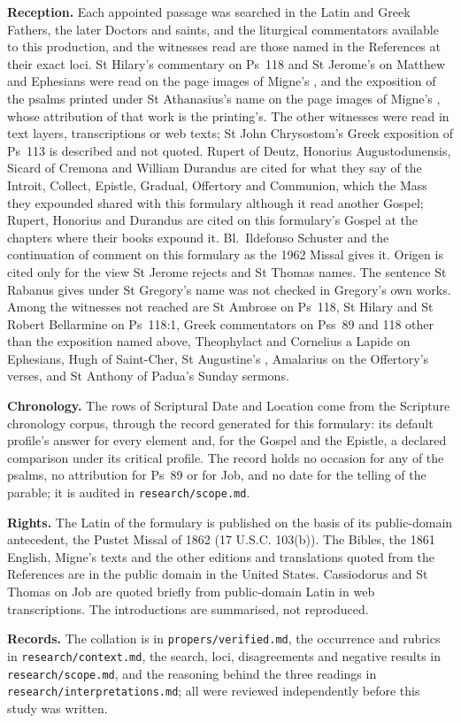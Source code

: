 {\textbf{Reception.} Each appointed passage was searched in the Latin and Greek
Fathers, the later Doctors and saints, and the liturgical commentators available to
this production, and the witnesses read are those named in the References at their
exact loci. St Hilary's commentary on Ps~118 and St Jerome's on Matthew and
Ephesians were read on the page images of Migne's , and the
exposition of the psalms printed under St Athanasius's name on the page images of
Migne's , whose attribution of that work is the printing's.
The other witnesses were read in text layers, transcriptions or web texts; St John
Chrysostom's Greek exposition of Ps~113 is described and not quoted. Rupert of Deutz, Honorius Augustodunensis, Sicard of Cremona and William
Durandus are cited for what they say of the Introit, Collect, Epistle, Gradual,
Offertory and Communion, which the Mass they expounded shared with this formulary
although it read another Gospel; Rupert, Honorius and Durandus are cited on this
formulary's Gospel at the chapters where their books expound it. Bl.\ Ildefonso
Schuster and the continuation of  comment on this
formulary as the 1962 Missal gives it. Origen is cited only for the view St Jerome
rejects and St Thomas names. The sentence St Rabanus gives under St Gregory's name
was not checked in Gregory's own works. Among the
witnesses not reached are St Ambrose on Ps~118, St Hilary and St Robert Bellarmine
on Ps~118:1, Greek commentators on Pss~89 and 118 other than the exposition named
above, Theophylact and Cornelius a Lapide on Ephesians, Hugh of Saint-Cher, St
Augustine's , Amalarius on the Offertory's verses, and St
Anthony of Padua's Sunday sermons.

\textbf{Chronology.} The rows of Scriptural Date and Location come from the
Scripture chronology corpus, through the record generated for this formulary: its
default profile's answer for every element and, for the Gospel and the Epistle, a
declared comparison under its critical profile. The record holds no occasion for any of the psalms, no
attribution for Ps~89 or for Job, and no date for the telling of the parable; it is
audited in \texttt{research/scope.md}.

\textbf{Rights.} The Latin of the formulary is published on the basis of its
public-domain antecedent, the Pustet Missal of 1862 (17 U.S.C. 103(b)). The Bibles,
the 1861 English, Migne's texts and the other editions and translations quoted from
the References are in the public domain in the United States. Cassiodorus and
St Thomas on Job are quoted briefly from public-domain Latin in web transcriptions.
The  introductions are summarised, not reproduced.

\textbf{Records.} The collation is in \texttt{propers/verified.md}, the occurrence
and rubrics in \texttt{research/context.md}, the search, loci, disagreements and
negative results in \texttt{research/scope.md}, and the reasoning behind the three
readings in \texttt{research/interpretations.md}; all were reviewed independently
before this study was written.
\par}

